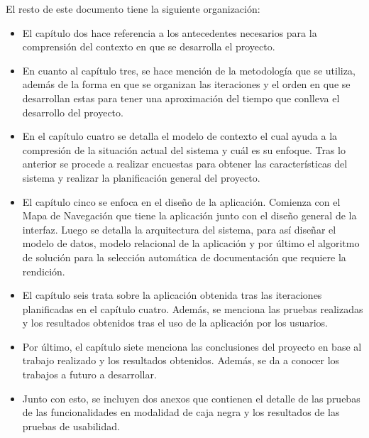 El resto de este documento tiene la siguiente organización:

\begin{itemize}
    \item El capítulo dos hace referencia a los antecedentes necesarios para la comprensión del contexto en que se desarrolla el proyecto.
    \item En cuanto al capítulo tres, se hace mención de la metodología que se utiliza, además de la forma en que se organizan las iteraciones y el orden en que se desarrollan estas para tener una aproximación del tiempo que conlleva el desarrollo del proyecto.
    \item En el capítulo cuatro se detalla el modelo de contexto el cual ayuda a la compresión de la situación actual del sistema y cuál es su enfoque. Tras lo anterior se procede a realizar encuestas para obtener las características del sistema y realizar la planificación general del proyecto.
    \item El capítulo cinco se enfoca en el diseño de la aplicación. Comienza con el Mapa de Navegación que tiene la aplicación junto con el diseño general de la interfaz. Luego se detalla la arquitectura del sistema, para así diseñar el modelo de datos, modelo relacional de la aplicación y por último el algoritmo de solución para la selección automática de documentación que requiere la rendición.
    \item El capítulo seis trata sobre la aplicación obtenida tras las iteraciones planificadas en el capítulo cuatro. Además, se menciona las pruebas realizadas y los resultados obtenidos tras el uso de la aplicación por los usuarios.
    \item Por último, el capítulo siete menciona las conclusiones del proyecto en base al trabajo realizado y los resultados obtenidos. Además, se da a conocer los trabajos a futuro a desarrollar.
    \item Junto con esto, se incluyen dos anexos que contienen el detalle de las pruebas de las funcionalidades en modalidad de caja negra y los resultados de las pruebas de usabilidad.
\end{itemize}

